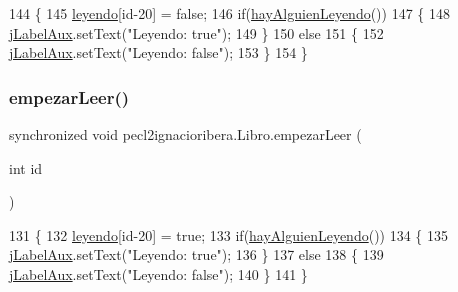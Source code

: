 \begin{DoxyCode}
144     \{
145         \mbox{\hyperlink{classpecl2ignacioribera_1_1_libro_adc1f39f45ab2ae4174206c9ee53f2f97}{leyendo}}[\textcolor{keywordtype}{id}-20] = \textcolor{keyword}{false};
146         \textcolor{keywordflow}{if}(\mbox{\hyperlink{classpecl2ignacioribera_1_1_libro_a3ec78c4737fd60d84388e87f7f1d606f}{hayAlguienLeyendo}}())
147         \{
148             \mbox{\hyperlink{classpecl2ignacioribera_1_1_libro_a4dfd577c8a08d50696cc33d536d5f2fa}{jLabelAux}}.setText(\textcolor{stringliteral}{"Leyendo: true"});
149         \}
150         \textcolor{keywordflow}{else}
151         \{
152             \mbox{\hyperlink{classpecl2ignacioribera_1_1_libro_a4dfd577c8a08d50696cc33d536d5f2fa}{jLabelAux}}.setText(\textcolor{stringliteral}{"Leyendo: false"});
153         \}
154     \}
\end{DoxyCode}
\mbox{\label{classpecl2ignacioribera_1_1_libro_a62a722c8f7e5675f5ab3561a86eda1c1}} 
\subsubsection{\texorpdfstring{empezar\+Leer()}{empezarLeer()}}
{\footnotesize\ttfamily synchronized void pecl2ignacioribera.\+Libro.\+empezar\+Leer (\begin{DoxyParamCaption}\item[{int}]{id }\end{DoxyParamCaption})\hspace{0.3cm}{\ttfamily [inline]}}


\begin{DoxyCode}
131     \{
132         \mbox{\hyperlink{classpecl2ignacioribera_1_1_libro_adc1f39f45ab2ae4174206c9ee53f2f97}{leyendo}}[\textcolor{keywordtype}{id}-20] = \textcolor{keyword}{true};
133         \textcolor{keywordflow}{if}(\mbox{\hyperlink{classpecl2ignacioribera_1_1_libro_a3ec78c4737fd60d84388e87f7f1d606f}{hayAlguienLeyendo}}())
134         \{
135             \mbox{\hyperlink{classpecl2ignacioribera_1_1_libro_a4dfd577c8a08d50696cc33d536d5f2fa}{jLabelAux}}.setText(\textcolor{stringliteral}{"Leyendo: true"});
136         \}
137         \textcolor{keywordflow}{else}
138         \{
139             \mbox{\hyperlink{classpecl2ignacioribera_1_1_libro_a4dfd577c8a08d50696cc33d536d5f2fa}{jLabelAux}}.setText(\textcolor{stringliteral}{"Leyendo: false"});
140         \}
141     \}
\end{DoxyCode}
\mbox{\label{classpecl2ignacioribera_1_1_libro_ac19867792e66d8a51752c91888b25e07}} 
